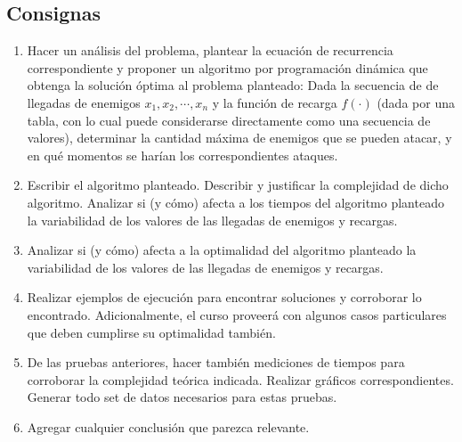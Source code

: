 \subsection{Consignas}
\begin{enumerate}
    \item Hacer un análisis del problema, plantear la ecuación de recurrencia correspondiente y proponer un algoritmo por programación dinámica que obtenga la solución óptima al problema planteado: Dada la secuencia de de llegadas de enemigos $x_1, x_2, \cdots, x_n$ y la función de recarga $f(\cdot)$ (dada por una tabla, con lo cual puede considerarse directamente como una secuencia de valores), determinar la cantidad máxima de enemigos que se pueden atacar, y en qué momentos se harían los correspondientes ataques.
    \item Escribir el algoritmo planteado. Describir y justificar la complejidad de dicho algoritmo. Analizar si (y cómo) afecta a los tiempos del algoritmo planteado la variabilidad de los valores de las llegadas de enemigos y recargas.
    \item Analizar si (y cómo) afecta a la optimalidad del algoritmo planteado la variabilidad de los valores de las llegadas de enemigos y recargas.
    \item Realizar ejemplos de ejecución para encontrar soluciones y corroborar lo encontrado. Adicionalmente, el curso proveerá con algunos casos particulares que deben cumplirse su optimalidad también.
    \item De las pruebas anteriores, hacer también mediciones de tiempos para corroborar la complejidad teórica indicada. Realizar gráficos correspondientes. Generar todo set de datos necesarios para estas pruebas.
    \item  Agregar cualquier conclusión que parezca relevante.

\end{enumerate}